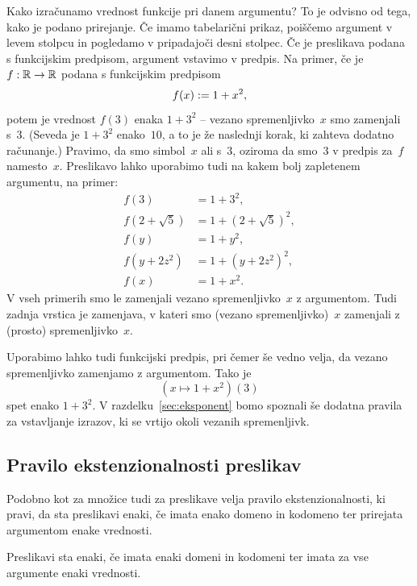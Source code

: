 Kako izračunamo vrednost funkcije pri danem argumentu? To je odvisno od tega,
kako je podano prirejanje. Če imamo tabelarični prikaz, poiščemo argument v levem stolpcu
in pogledamo v pripadajoči desni stolpec. Če je preslikava podana s funkcijskim predpisom, argument
vstavimo v predpis. Na primer, če je $f : \mathbb{R} \to \mathbb{R}$ podana s funkcijskim predpisom
%
\begin{equation*}
  f(x) \mathrel{{:}{=}} 1 + x^2,
\end{equation*}
%
potem je vrednost $f(3)$ enaka $1 + 3^2$ -- vezano spremenljivko~$x$ smo zamenjali s~$3$. (Seveda je $1 + 3^2$ enako~$10$, a to je že naslednji korak, ki zahteva dodatno računanje.)
Pravimo, da smo simbol~$x$  ali
 s~$3$, oziroma da smo~$3$  v predpis za~$f$ namesto~$x$. 
%
Preslikavo lahko uporabimo tudi na kakem bolj zapletenem argumentu, na primer:
%
\begin{align*}
  f(3) &= 1 + 3^2, \\
  f(2 + \sqrt{5}) &= 1 + (2 + \sqrt{5})^2, \\
  f(y) &= 1 + y^2, \\
  f(y + 2 z^2) &= 1 + (y + 2 z^2)^2, \\
  f(x) &= 1 + x^2.
\end{align*}
%
V vseh primerih smo le zamenjali vezano spremenljivko~$x$ z argumentom.
%
Tudi zadnja vrstica je zamenjava, v kateri smo (vezano spremenljivko)~$x$ zamenjali z (prosto) spremenljivko~$x$.

Uporabimo lahko tudi funkcijski predpis, pri čemer še vedno velja, da vezano spremenljivko zamenjamo z argumentom.
Tako je
%
\begin{equation*}
  (x \mapsto 1 + x^2)(3)
\end{equation*}
%
spet enako $1 + 3^2$.
%
V razdelku~\ref{sec:eksponent} bomo spoznali še dodatna pravila za vstavljanje izrazov, ki se vrtijo okoli vezanih spremenljivk.


\subsection{Pravilo ekstenzionalnosti preslikav}

Podobno kot za množice tudi za preslikave velja pravilo ekstenzionalnosti, ki pravi, da sta preslikavi enaki, če imata enako domeno in kodomeno ter prirejata argumentom enake vrednosti.


\begin{pravilo}
  Preslikavi sta enaki, če imata enaki domeni in kodomeni ter imata za vse argumente
  enaki vrednosti.
\end{pravilo}

